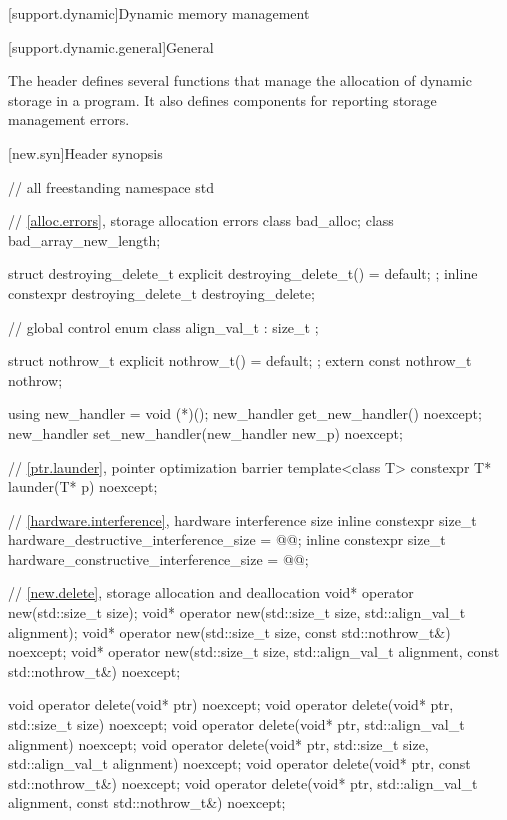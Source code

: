 
[support.dynamic]{Dynamic memory management}

[support.dynamic.general]{General}

\pnum
The header  defines several
functions that manage the allocation of dynamic storage in a program.
It also defines components for reporting storage management errors.

[new.syn]{Header  synopsis}
\begin{codeblock}
// all freestanding
namespace std {
  // \ref{alloc.errors}, storage allocation errors
  class bad_alloc;
  class bad_array_new_length;

  struct destroying_delete_t {
    explicit destroying_delete_t() = default;
  };
  inline constexpr destroying_delete_t destroying_delete{};

  // global  control%
  enum class align_val_t : size_t {};

  struct nothrow_t { explicit nothrow_t() = default; };
  extern const nothrow_t nothrow;

  using new_handler = void (*)();
  new_handler get_new_handler() noexcept;
  new_handler set_new_handler(new_handler new_p) noexcept;

  // \ref{ptr.launder}, pointer optimization barrier
  template<class T> constexpr T* launder(T* p) noexcept;

  // \ref{hardware.interference}, hardware interference size
  inline constexpr size_t hardware_destructive_interference_size = @\impdef{}@;
  inline constexpr size_t hardware_constructive_interference_size = @\impdef{}@;
}

// \ref{new.delete}, storage allocation and deallocation
void* operator new(std::size_t size);
void* operator new(std::size_t size, std::align_val_t alignment);
void* operator new(std::size_t size, const std::nothrow_t&) noexcept;
void* operator new(std::size_t size, std::align_val_t alignment, const std::nothrow_t&) noexcept;

void operator delete(void* ptr) noexcept;
void operator delete(void* ptr, std::size_t size) noexcept;
void operator delete(void* ptr, std::align_val_t alignment) noexcept;
void operator delete(void* ptr, std::size_t size, std::align_val_t alignment) noexcept;
void operator delete(void* ptr, const std::nothrow_t&) noexcept;
void operator delete(void* ptr, std::align_val_t alignment, const std::nothrow_t&) noexcept;


\end{codeblock}
